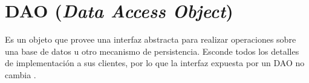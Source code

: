 \section{DAO (\textit{Data Access Object})}

Es un objeto que provee una interfaz abstracta para realizar operaciones sobre una base de datos u otro mecanismo de persistencia. Esconde todos los detalles de implementación a sus clientes, por lo que la interfaz expuesta por un DAO no cambia \cite{DAO0}.